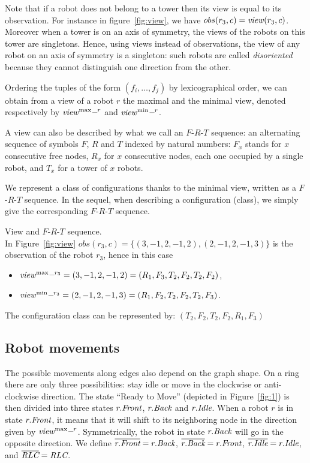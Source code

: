 Note that if a robot does not belong to a tower then its view is equal
to its observation. For instance in figure~\ref{fig:view}, we have $obs(r_3,c) =
\mathit{view}(r_3,c)$.  Moreover when a tower is on an axis of symmetry, the views of the robots 
on this tower are singletons. Hence, using views instead of observations, the view of any
robot on an axis of symmetry is a singleton: such robots 
are called \emph{disoriented}  because they cannot distinguish one 
direction from the other. 


Ordering the tuples of the form $(f_i,\dots,f_j)$ by lexicographical
order, we can obtain from a view of a robot $r$ the maximal and the minimal view,
denoted respectively by $\mathit{view}^{\max\_r}$ and $\mathit{view}^{\min\_r}$.

A view can also be described by what we call an
$F$-$R$-$T$ sequence: an alternating sequence of symbols $F$, $R$ and
$T$ indexed by natural numbers: $F_x$ stands for $x$ consecutive free
nodes, $R_x$ for $x$ consecutive nodes, each one occupied by a single
robot, and $T_x$ for a tower of $x$ robots.

We represent a class of configurations thanks to the minimal view,
written as a $F$-$R$-$T$ sequence. In the sequel, when describing 
a configuration (class), we simply give the corresponding $F$-$R$-$T$ sequence.

\begin{example}View and $F$-$R$-$T$ sequence.\\
In Figure~\ref{fig:view}   					%
$obs(r_3,c)= \{(3,-1,2,-1,2),(2,-1,2,-1,3)\}$
is the observation of the robot $r_3$,
hence in this case 
\begin{itemize}
\item $\mathit{view}^{\max\_r_3} = (3,-1,2,-1,2) = (R_1,F_3, T_2,F_2,T_2,F_2)$, 
\item $\mathit{view}^{\min\_r_3} = (2,-1,2,-1,3) = (R_1, F_2, T_2,F_2,T_2,F_3)$.
\end{itemize}
The configuration class can be represented by: $(T_2,F_2,T_2,F_2,R_1,F_3)$
\end{example}


\subsection{Robot movements}
\label{subsub:move}
The possible movements along edges also depend on the graph shape. On
a ring there are only three possibilities: stay idle or move in
the clockwise or anti-clockwise direction. The state
``Ready to Move'' (depicted in Figure~\ref{fig:1}) is then divided
into three states $r.\textit{Front}$, $r.\textit{Back}$ and
$r.\textit{Idle}$. When a robot $r$ is in state $r.\textit{Front}$, it
means that it will shift to its neighboring node in the direction
given by $\mathit{view}^{\max\_r}$.  Symmetrically, the robot in state
$r.\textit{Back}$ will go in the opposite direction.
We define $\overline{r.\textit{Front}} = r.\textit{Back}$, 			%
$\overline{r.\textit{Back}} = r.\textit{Front}$, 
$\overline{r.\textit{Idle}} = r.\textit{Idle}$, and $ \overline{\textit{RLC}} = \textit{RLC}$.


